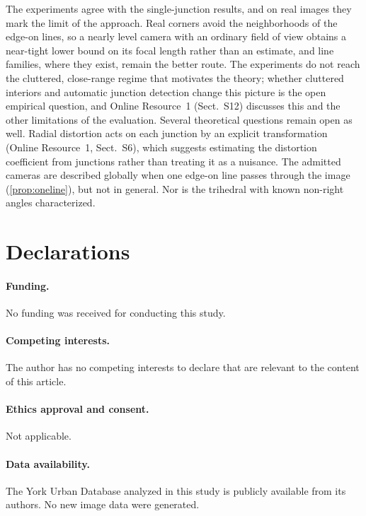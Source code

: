 \documentclass[pdflatex,sn-mathphys-num,iicol]{sn-jnl}
\newcommand{\OR}{Online Resource~1}
\theoremstyle{thmstyleone}
\theoremstyle{thmstylethree}
\theoremstyle{thmstyletwo}
\begin{document}
The experiments agree with the single-junction results, and on real images they mark the limit of the approach. Real corners avoid the neighborhoods of the edge-on lines, so a nearly level camera with an ordinary field of view obtains a near-tight lower bound on its focal length rather than an estimate, and line families, where they exist, remain the better route. The experiments do not reach the cluttered, close-range regime that motivates the theory; whether cluttered interiors and automatic junction detection change this picture is the open empirical question, and \OR{} (Sect.~S12) discusses this and the other limitations of the evaluation. Several theoretical questions remain open as well. Radial distortion acts on each junction by an explicit transformation (\OR, Sect.~S6), which suggests estimating the distortion coefficient from junctions rather than treating it as a nuisance. The admitted cameras are described globally when one edge-on line passes through the image (\cref{prop:oneline}), but not in general. Nor is the trihedral with known non-right angles characterized.

\backmatter

\section*{Declarations}

\paragraph{Funding.} No funding was received for conducting this study.

\paragraph{Competing interests.} The author has no competing interests to declare that are relevant to the content of this article.

\paragraph{Ethics approval and consent.} Not applicable.

\paragraph{Data availability.} The York Urban Database \citep{denis2008} analyzed in this study is publicly available from its authors. No new image data were generated.
\end{document}
